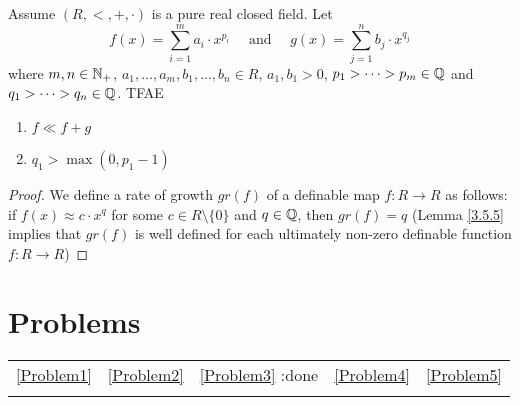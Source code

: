 \documentclass[11pt]{article}
\begin{document}
\begin{theorem}[]
Assume \((R,<,+,\cdot)\) is a pure real closed field. Let
\begin{equation*}
f(x)=\sum_{i=1}^ma_i\cdot x^{p_i}\quad\text{ and }\quad g(x)=\sum_{j=1}^nb_j\cdot x^{q_j}
\end{equation*}
where \(m,n\in\mathbb{N}_+\), \(a_1,\dots,a_m,b_1,\dots,b_n\in R\), \(a_1,b_1>0\), \(p_1>\dots>p_m\in\mathbb{Q}\) and \(q_1>\dots>q_n\in\mathbb{Q}\). TFAE
\begin{enumerate}
\item \(f\ll f+g\)
\item \(q_1>\max(0,p_1-1)\)
\end{enumerate}
\end{theorem}

\begin{proof}
We define a rate of growth \(gr(f)\) of a definable map \(f:R\to R\) as follows:
if \(f(x)\approx c\cdot x^q\) for some \(c\in R\setminus\{0\}\) and \(q\in\mathbb{Q}\), then \(gr(f)=q\) (Lemma \ref{3.5.5} implies
that \(gr(f)\) is well defined for each ultimately non-zero definable function \(f:R\to R\))
\end{proof}


\section{Problems}
\label{sec:org4a347eb}
\begin{center}
\begin{tabular}{lllll}
\ref{Problem1} & \ref{Problem2} & \ref{Problem3} :done & \ref{Problem4} & \ref{Problem5}\\
 &  &  &  & \\
\end{tabular}
\end{center}
\end{document}
